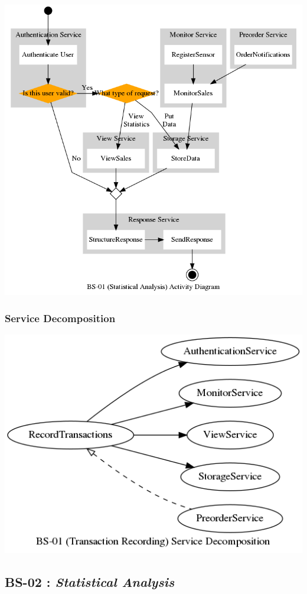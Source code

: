 \documentclass[11pt]{article}
\begin{document}
\begin{center}
\includegraphics[width=.9\linewidth]{res/bs_01_act.png}
\end{center}
\subsubsection{Service Decomposition}
\label{sec:orgaf66584}
\begin{center}
\includegraphics[width=.9\linewidth]{res/bs_01_dcmp.png}
\end{center}
\newpage

\subsection{\label{org01c8264}BS-02 : \emph{Statistical Analysis}}
\label{sec:org3d56cd0}
\end{document}
